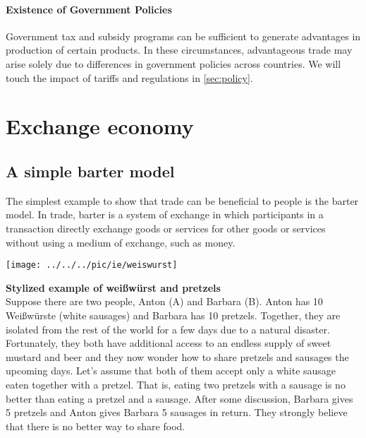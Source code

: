 {	\paragraph{Existence of Government Policies}
	Government tax and subsidy programs can be sufficient to generate advantages in production of certain products. In these circumstances, advantageous trade may arise solely due to differences in government policies across countries. We will touch the impact of tariffs and regulations in \autoref{sec:policy}.
	
	
	
	
	
	
	\pbn
	\section{Exchange economy}\label{sec:exchange-economy}
	
	
	\subsection{A simple barter model}
	
	The simplest example to show that trade can be beneficial to people is the barter model. In trade, barter is a system of exchange in which participants in a transaction directly exchange goods or services for other goods or services without using a medium of exchange, such as money. 
	
	
	\begin{minipage}{0.4\linewidth}	\begin{center}
			\texttt{[image: ../../../pic/ie/weiswurst]}
		\end{center}
	\end{minipage}
	\begin{minipage}{0.6\linewidth}	\textbf{Stylized example of weißwürst and pretzels}\\
		Suppose there are two people, Anton (A) and Barbara (B). Anton has 10 Weißwürste (white sausages) and Barbara has 10 pretzels. Together, they are isolated from the rest of the world for a few days due to a natural disaster. Fortunately, they both have additional access to an endless supply of sweet mustard and beer and they now wonder how to share pretzels and sausages the upcoming days. Let's assume that both of them accept only a white sausage eaten together with a pretzel. That is, eating two pretzels with a sausage is no better than eating a pretzel and a sausage. After some discussion, Barbara gives 5 pretzels and Anton gives Barbara 5 sausages in return. They strongly believe that there is no better way to share food.
	\end{minipage}
	
}
